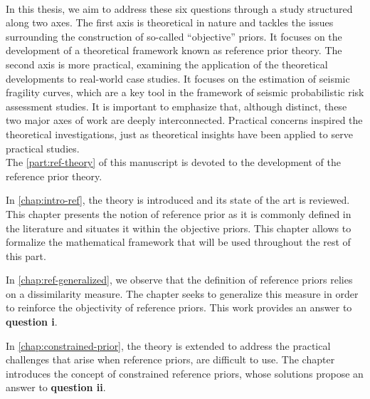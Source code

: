 


\\[1pt]


In this thesis, we aim to address these six questions through a study structured along two axes.
The first axis is theoretical in nature and tackles the issues surrounding the construction of so-called ``objective'' priors. It focuses on the development of a theoretical framework known as reference prior theory.
The second axis is more practical, examining the application of the theoretical developments to real-world case studies. It focuses  on the estimation of seismic fragility curves, which are a key tool in the framework of seismic probabilistic risk assessment studies.
It is important to emphasize that, although distinct, these two major axes of work are deeply interconnected. Practical concerns inspired the theoretical investigations, just as theoretical insights have been applied to serve practical studies.\\



The \cref{part:ref-theory} of this manuscript is devoted to the development of the reference prior theory.

\noindent
In \cref{chap:intro-ref}, the theory is introduced and its state of the art is reviewed. This chapter presents the notion of reference prior as it is commonly defined in the literature and situates it within the objective priors. This chapter allows to formalize the mathematical framework that will be used throughout the rest of this part.

\noindent
In \cref{chap:ref-generalized}, we observe that the definition of reference priors relies on a dissimilarity measure. The chapter seeks to generalize this measure in order to reinforce the objectivity of reference priors. This work provides an answer to \textbf{question i}.

\noindent
In \cref{chap:constrained-prior}, the theory is extended to address the practical challenges that arise when reference priors, are difficult to use. The chapter introduces the concept of constrained reference priors, whose solutions propose an answer to \textbf{question ii}.

